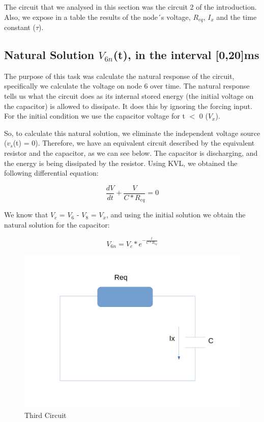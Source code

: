 \par The circuit that we analysed in this section was the circuit 2 of the introduction. Also, we expose in a table the results of the node´s voltage, $R_{eq}$, $I_x$ and the time constant ($\tau$).

 
\subsection{Natural Solution $V_{6n}$(t), in the interval [0,20]ms}

The purpose of this task was calculate the natural response of the circuit, specifically we calculate the voltage on node 6 over time. The natural response tells us what the circuit does as its internal stored energy (the initial voltage on the capacitor) is allowed to dissipate. It does this by ignoring the forcing input. For the initial condition we use the capacitor voltage for t $<$ 0 ($V_x$). 

\par So, to calculate this natural solution, we eliminate the independent voltage source ($v_s$(t) = 0). Therefore, we have an equivalent circuit described by the equivalent resistor and the capacitor, as we can see below. The capacitor is discharging, and the energy is being dissipated by the resistor. Using KVL, we obtained the following differential equation:


\begin{equation}
    \frac{dV}{dt} + \frac{V}{C*R_{eq}} = 0
\end{equation}

\par We know that $V_c$ = $V_6$ - $V_8$ = $V_x$, and using the initial solution we obtain the natural solution for the capacitor:

\begin{equation}
    V_{6n} = V_{c}*e^{-\frac{t}{C*R_{eq}}}
\end{equation}

\begin{figure}[h] \centering
\includegraphics[width=0.7\linewidth]{Circuito3.pdf}
\caption{Third Circuit}
\label{fig:snat}
\end{figure}

